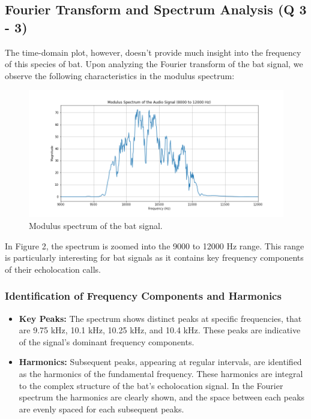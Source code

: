 \documentclass[12pt]{article}
\begin{document}
\subsection{Fourier Transform and Spectrum Analysis (Q 3 - 3)}
The time-domain plot, however, doesn't provide much insight into the frequency of this species of bat. Upon analyzing the Fourier transform of the bat signal, we observe the following characteristics in the modulus spectrum:

\begin{figure}[h]
\centering
\includegraphics[width=1\textwidth]{modulus_spectrum.png}
\caption{Modulus spectrum of the bat signal.}
\end{figure}

In Figure 2, the spectrum is zoomed into the 9000 to 12000 Hz range. This range is particularly interesting for bat signals as it contains key frequency components of their echolocation calls.

\subsubsection*{Identification of Frequency Components and Harmonics}
\begin{itemize}
    \item \textbf{Key Peaks:} The spectrum shows distinct peaks at specific frequencies, that are 9.75 kHz, 10.1 kHz, 10.25 kHz, and 10.4 kHz. These peaks are indicative of the signal's dominant frequency components.
        
    \item \textbf{Harmonics:} Subsequent peaks, appearing at regular intervals, are identified as the harmonics of the fundamental frequency. These harmonics are integral to the complex structure of the bat's echolocation signal. In the Fourier spectrum the harmonics are clearly shown, and the space between each peaks are evenly spaced for each subsequent peaks.
\end{itemize}
\end{document}
